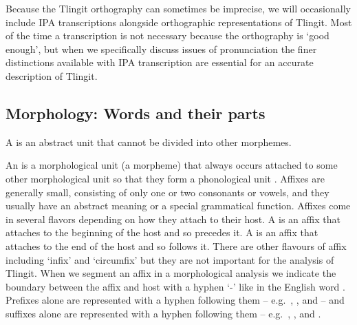 Because the Tlingit orthography can sometimes be imprecise, we will occasionally include IPA transcriptions alongside orthographic representations of Tlingit.
Most of the time a transcription is not necessary because the orthography is ‘good enough’, but when we specifically discuss issues of pronunciation the finer distinctions available with IPA transcription are essential for an accurate description of Tlingit.

\subsection{Morphology: Words and their parts}\label{sec:intro-ling-morph}


A  is an abstract unit that cannot be divided into other morphemes.

An  is a morphological unit (a morpheme) that always occurs attached to some other morphological unit so that they form a phonological unit \parencite[9]{booij:2007}.
Affixes are generally small, consisting of only one or two consonants or vowels, and they usually have an abstract meaning or a special grammatical function.
Affixes come in several flavors depending on how they attach to their host.
A  is an affix that attaches to the beginning of the host and so precedes it.
A  is an affix that attaches to the end of the host and so follows it.
There are other flavours of affix including ‘infix’ and ‘circumfix’ but they are not important for the analysis of Tlingit.
When we segment an affix in a morphological analysis we indicate the boundary between the affix and host with a hyphen ‘-’ like in the English word .
Prefixes alone are represented with a hyphen following them – e.g.\ , , and  – and suffixes alone are represented with a hyphen following them – e.g.\ , , and .


